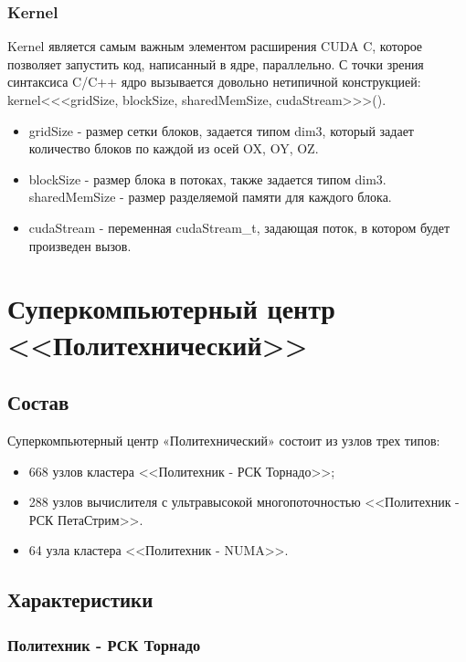 \documentclass[a4paper, final]{article}
\begin{document}
\subsubsection{Kernel}
Kernel является самым важным элементом расширения CUDA C, 
которое позволяет запустить код, написанный в ядре, параллельно. С точки 
зрения синтаксиса C/C++ ядро вызывается довольно нетипичной 
конструкцией:
kernel<<<gridSize, blockSize, \newline sharedMemSize, cudaStream>>>().
\begin{itemize}

\item gridSize - размер сетки блоков, задается типом dim3, который задает 
количество блоков по каждой из осей OX, OY, OZ.
\item blockSize - размер блока в потоках, также задается типом dim3.
sharedMemSize - размер разделяемой памяти для каждого блока.
\item cudaStream - переменная cudaStream\_t, задающая поток, в котором 
будет произведен вызов.
\end{itemize}

   


    \newpage
\section{Суперкомпьютерный центр <<Политехнический>>}
\subsection{Состав}

Суперкомпьютерный центр «Политехнический» состоит из узлов трех типов:
\begin{itemize}
    \item 668 узлов кластера <<Политехник - РСК Торнадо>>;
    \item 288 узлов вычислителя с ультравысокой многопоточностью <<Политехник - РСК ПетаСтрим>>.
    \item 64 узла кластера <<Политехник - NUMA>>.
\end{itemize}

\subsection{Характеристики}
\subsubsection*{Политехник - РСК Торнадо}
\end{document}
